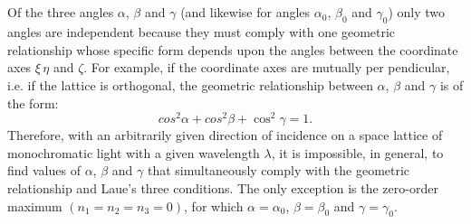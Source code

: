 \clearpage

\subsection{}\label{33.4.2} Of the three angles $\alpha$, $\beta$ and $\gamma$ (and likewise for angles
$\alpha_{0}$, $\beta_{0}$ and $\gamma_{0}$) only two angles are independent because they must comply with one geometric relationship whose specific form depends upon the angles between the coordinate axes $\xi  \, \eta $ and $\zeta$. For example, if the coordinate axes are mutually per­ pendicular, i.e. if the lattice is orthogonal, the geometric relationship
between $\alpha$, $\beta$ and $\gamma$ is of the form:
\begin{equation*}%
cos^{2} \alpha + cos^{2} \beta + \cos^{2} \gamma = 1.
\end{equation*}
Therefore, with an arbitrarily given direction of incidence on
a space lattice of monochromatic light with a given wavelength $\lambda$, it is impossible, in general, to find values of $\alpha$, $\beta$ and $\gamma$ that simultaneously comply with the geometric relationship and Laue's three conditions. The only exception is the zero-order maximum $(n_{1} = n_{2} = n_{3} = 0)$, for which $\alpha = \alpha_{0}$, $\beta = \beta_{0}$ and $\gamma = \gamma_{0}$.


